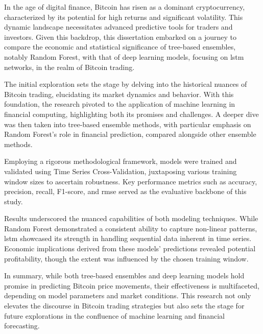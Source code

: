 

In the age of digital finance, Bitcoin has risen as a dominant cryptocurrency, characterized by its potential for high returns and significant volatility. This dynamic landscape necessitates advanced predictive tools for traders and investors. Given this backdrop, this dissertation embarked on a journey to compare the economic and statistical significance of tree-based ensembles, notably Random Forest, with that of deep learning models, focusing on \gls{lstm} networks, in the realm of Bitcoin trading.



\smallskip
The initial exploration sets the stage by delving into the historical nuances of Bitcoin trading, elucidating its market dynamics and behavior. With this foundation, the research pivoted to the application of machine learning in financial computing, highlighting both its promises and challenges. A deeper dive was then taken into tree-based ensemble methods, with particular emphasis on Random Forest's role in financial prediction, compared alongside other ensemble methods.

Employing a rigorous methodological framework, models were trained and validated using Time Series Cross-Validation, juxtaposing various training window sizes to ascertain robustness. Key performance metrics such as accuracy, precision, recall, F1-score, and \gls{rmse} served as the evaluative backbone of this study.

\smallskip
Results underscored the nuanced capabilities of both modeling techniques. While Random Forest demonstrated a consistent ability to capture non-linear patterns, \gls{lstm} showcased its strength in handling sequential data inherent in time series. Economic implications derived from these models' predictions revealed potential profitability, though the extent was influenced by the chosen training window.

In summary, while both tree-based ensembles and deep learning models hold promise in predicting Bitcoin price movements, their effectiveness is multifaceted, depending on model parameters and market conditions. This research not only elevates the discourse in Bitcoin trading strategies but also sets the stage for future explorations in the confluence of machine learning and financial forecasting.


